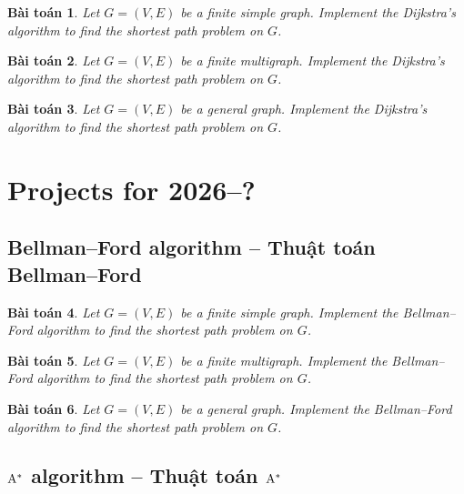 \documentclass{article}
\newtheorem{baitoan}{Bài toán}
\begin{document}
\begin{baitoan}
    Let $G = (V,E)$ be a finite simple graph. Implement the Dijkstra's algorithm to find the shortest path problem on $G$.
\end{baitoan}

\begin{baitoan}
    Let $G = (V,E)$ be a finite multigraph. Implement the Dijkstra's algorithm to find the shortest path problem on $G$.
\end{baitoan}

\begin{baitoan}
    Let $G = (V,E)$ be a general graph. Implement the Dijkstra's algorithm to find the shortest path problem on $G$.
\end{baitoan}


\section{Projects for 2026--?}


\subsection{Bellman--Ford algorithm -- Thuật toán Bellman--Ford}

\begin{baitoan}
    Let $G = (V,E)$ be a finite simple graph. Implement the Bellman--Ford algorithm to find the shortest path problem on $G$.
\end{baitoan}

\begin{baitoan}
    Let $G = (V,E)$ be a finite multigraph. Implement the Bellman--Ford algorithm to find the shortest path problem on $G$.
\end{baitoan}

\begin{baitoan}
    Let $G = (V,E)$ be a general graph. Implement the Bellman--Ford algorithm to find the shortest path problem on $G$.
\end{baitoan}


\subsection{$\rm A^*$ algorithm -- Thuật toán $\rm A^*$}
\end{document}
